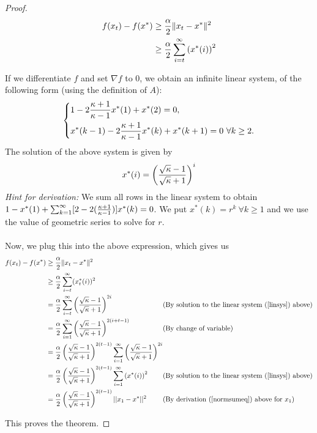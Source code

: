 \documentclass{article}
\begin{document}
\begin{proof}
\begin{equation}
	\begin{split}
	f(x_t) - f(x^*) & \geq {\alpha \over 2} \| x_t - x^* \|^2 \\
	 & \geq {\alpha \over 2} \sum_{i=t}^{\infty} \left( x^*(i) \right)^2
	\end{split}
\end{equation}

If we differentiate $f$ and set $\nabla f$ to $0$, we obtain an infinite linear system, of the following form (using the definition of $A$):
\begin{equation}\label{linsys}
    \left\{
	\begin{aligned}
		& 1 - 2{\kappa + 1 \over \kappa - 1}x^*(1) + x^*(2) = 0, \\
        & x^*(k-1) - 2{\kappa + 1 \over \kappa - 1}x^*(k) + x^*(k+1) = 0 \ \forall k \geq 2.
	\end{aligned}
	\right.
\end{equation}
The solution of the above system is given by
\[
x^*(i) = \left( \sqrt{\kappa}-1 \over \sqrt{\kappa}+1 \right)^i
\]
\emph{Hint for derivation:} We sum all rows in the linear system to obtain $1 - x^*(1) + \sum_{k=1}^\infty [2 - 2({\kappa+1 \over \kappa -1})]x^*(k)=0$. We put $x^*(k)=r^k \ \forall k \geq 1$ and we use the value of geometric series to solve for $r$. \\
\\
Now, we plug this into the above expression, which gives us
\begin{equation}
	\begin{alignedat}{2}
	f(x_t) - f(x^*) & \geq {\alpha \over 2} \| x_t - x^* \|^2  &&\\
	 & \geq {\alpha \over 2} \sum_{i=t}^{\infty} (x_t^*(i))^2 &&\\
	  & = {\alpha \over 2} \sum_{i=t}^{\infty}  \left( \sqrt{\kappa}-1 \over \sqrt{\kappa}+1 \right)^{2i} && \text{(By solution to the linear system ($\ref{linsys}$) above)}\\
	  & = {\alpha \over 2} \sum_{i=1}^{\infty}  \left( \sqrt{\kappa}-1 \over \sqrt{\kappa}+1 \right)^{2(i+t-1)} &&\text{(By change of variable)}\\
	  &= \frac{\alpha}{2}\left({\sqrt{\kappa} - 1 \over \sqrt{\kappa} + 1}\right)^{2(t-1)} \sum_{i=1}^\infty \left({\sqrt{\kappa} - 1 \over \sqrt{\kappa} +1}\right)^{2i} &&\\
	  &= \frac{\alpha}{2} \left( \sqrt{\kappa} - 1 \over \sqrt{\kappa} + 1 \right)^{2(t-1)} \sum_{i=1}^{\infty} \left( x^*(i) \right)^{2} && \text{(By solution to the linear system ($\ref{linsys}$) above)}\\
	  & = {\alpha \over 2} \left( \sqrt{\kappa}-1 \over \sqrt{\kappa}+1 \right)^{2(t-1)}||x_1 - x^*||^2 && \text{(By derivation ($\ref{normsumeq}$) above for $x_1$)}
	\end{alignedat}
\end{equation}

This proves the theorem.

\end{proof}
\end{document}
